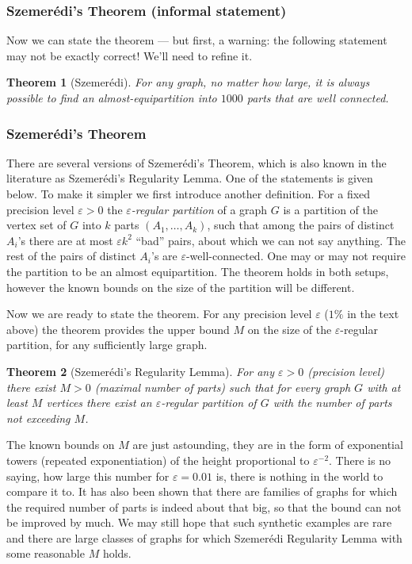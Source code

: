 \documentclass{amsart}
\newtheorem*{theorem}{Theorem}
\let\tmp\epsilon
\let\epsilon\varepsilon
\let\varepsilon\tmp
\begin{document}
\subsubsection{Szemer\'edi’s Theorem (informal statement)}

Now we can state the theorem — but first, a warning: the following
statement may not be exactly correct! We’ll need to refine it.

\begin{theorem}[Szemerédi]
  For any graph, no matter how large, it is always possible to find an
  almost-equipartition into $1000$ parts that are well connected.
\end{theorem}

\subsubsection{Szemer\'edi’s Theorem%
  \protect{}}
There are several versions of Szemer\'edi's Theorem, which is also
known in the literature as Szemer\'edi's Regularity Lemma. One of the
statements is given below. To make it simpler we first introduce
another definition. 
For a fixed precision level $\epsilon>0$
the \textit{$\epsilon$-regular partition} of a graph $G$ is a
partition of the vertex set of $G$ into $k$ parts
$(A_{1},\dots,A_{k})$, such that among the pairs of distinct $A_{i}$'s
there are at most $\epsilon k^{2}$ ``bad'' pairs, about which we can not
say anything. The rest of the pairs of distinct $A_{i}$'s are
$\epsilon$-well-connected. One may or may not require the partition
to be an almost equipartition. The theorem holds in both setups,
however the known bounds on the size of the partition will be
different.

Now we are ready to state the theorem.  For any precision level
$\epsilon$ ($1\%$ in the text above) the theorem provides the upper
bound $M$ on the size of the $\epsilon$-regular partition, for any
sufficiently large graph.
\begin{theorem}[Szemer\'edi's Regularity Lemma]
  For any $\epsilon>0$ (precision level) there exist $M>0$ (maximal
  number of parts) such that for every graph $G$ with at least $M$
  vertices there exist an $\epsilon$-regular
  partition of $G$ with the number of parts not exceeding $M$.
\end{theorem}
The known bounds on $M$ are just astounding,%
  they are in the form of exponential towers (repeated exponentiation)
  of the height proportional to $\epsilon^{-2}$.  There is no saying,
  how large this number for $\epsilon=0.01$ is, there is nothing in
  the world to compare it to. It has also been shown that there are
  families of graphs for which the required number of parts is indeed
  about that big, so that the bound can not be improved by much. We
  may still hope that such synthetic examples are rare and there are
  large classes of graphs for which Szemer\'edi Regularity Lemma with
  some reasonable $M$ holds.
\end{document}
